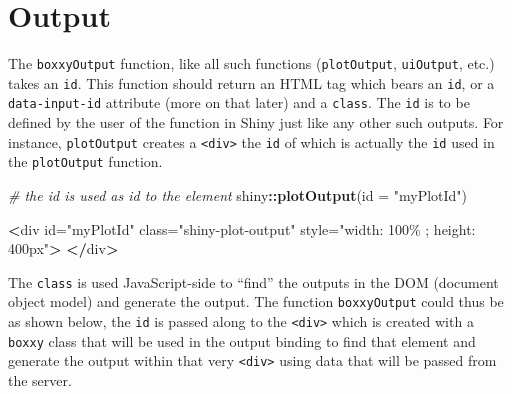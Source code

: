 \documentclass[
]{krantz}
\makeatletter
\newenvironment{Shaded}{\begin{snugshade}}{\end{snugshade}}
\newcommand{\CommentTok}[1]{\textcolor[rgb]{0.37,0.37,0.37}{\textit{#1}}}
\newcommand{\ControlFlowTok}[1]{\textcolor[rgb]{0.27,0.27,0.27}{\textbf{#1}}}
\newcommand{\DataTypeTok}[1]{\textcolor[rgb]{0.27,0.27,0.27}{#1}}
\newcommand{\ErrorTok}[1]{\textcolor[rgb]{0.14,0.14,0.14}{\textbf{#1}}}
\newcommand{\KeywordTok}[1]{\textcolor[rgb]{0.27,0.27,0.27}{\textbf{#1}}}
\newcommand{\NormalTok}[1]{#1}
\newcommand{\OperatorTok}[1]{\textcolor[rgb]{0.43,0.43,0.43}{\textbf{#1}}}
\newcommand{\StringTok}[1]{\textcolor[rgb]{0.5,0.5,0.5}{#1}}
\newenvironment{kframe}{%
\medskip{}
\setlength{\fboxsep}{.8em}
 \def\at@end@of@kframe{}%
 \ifinner\ifhmode%
  \def\at@end@of@kframe{\end{minipage}}%
  \begin{minipage}{\columnwidth}%
 \fi\fi%
 \def\FrameCommand##1{\hskip\@totalleftmargin \hskip-\fboxsep
 \colorbox{shadecolor}{##1}\hskip-\fboxsep
     \hskip-\linewidth \hskip-\@totalleftmargin \hskip\columnwidth}%
 \MakeFramed {\advance\hsize-\width
   \@totalleftmargin\z@ \linewidth\hsize
   \@setminipage}}%
 {\par\unskip\endMakeFramed%
 \at@end@of@kframe}
\renewenvironment{Shaded}{\begin{kframe}}{\end{kframe}}
\makeatother
\begin{document}
\hypertarget{output}{%
\section{Output}\label{output}}

The \texttt{boxxyOutput} function, like all such functions (\texttt{plotOutput}, \texttt{uiOutput}, etc.) takes an \texttt{id}. This function should return an HTML tag which bears an \texttt{id}, or a \texttt{data-input-id} attribute (more on that later) and a \texttt{class}. The \texttt{id} is to be defined by the user of the function in Shiny just like any other such outputs. For instance, \texttt{plotOutput} creates a \texttt{\textless{}div\textgreater{}} the \texttt{id} of which is actually the \texttt{id} used in the \texttt{plotOutput} function.

\begin{Shaded}
\begin{Highlighting}[]
\CommentTok{\# the id is used as id to the element}
\NormalTok{shiny}\OperatorTok{::}\KeywordTok{plotOutput}\NormalTok{(}\DataTypeTok{id =} \StringTok{"myPlotId"}\NormalTok{)}
\end{Highlighting}
\end{Shaded}

\begin{Shaded}
\begin{Highlighting}[]
\OperatorTok{<}\NormalTok{div }
\NormalTok{  id=}\StringTok{"myPlotId"} 
\NormalTok{  class=}\StringTok{"shiny{-}plot{-}output"} 
\NormalTok{  style=}\StringTok{"width: 100\% ; height: 400px"}\OperatorTok{>}
\ErrorTok{</}\NormalTok{div}\OperatorTok{>}
\end{Highlighting}
\end{Shaded}

The \texttt{class} is used JavaScript-side to ``find'' the outputs in the DOM (document object model) and generate the output. The function \texttt{boxxyOutput} could thus be as shown below, the \texttt{id} is passed along to the \texttt{\textless{}div\textgreater{}} which is created with a \texttt{boxxy} class that will be used in the output binding to find that element and generate the output within that very \texttt{\textless{}div\textgreater{}} using data that will be passed from the server.

\begin{Shaded}
\end{Shaded}
\end{document}
